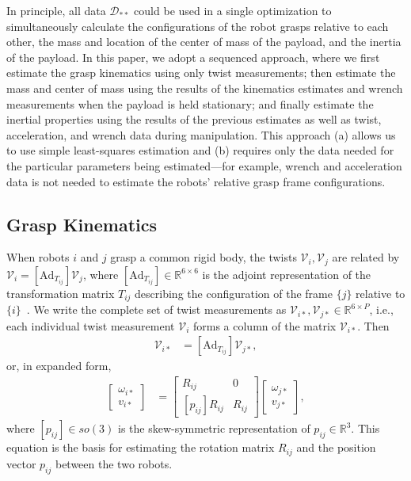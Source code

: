 \documentclass[letterpaper, 10 pt, journal, twoside]{IEEEtran}
\newcommand{\real}{\mathbb{R}}
\newcommand{\twist}{{\mathcal V}}
\begin{document}
In principle, all data $\mathcal{D}_{**}$ could be used in a single optimization to simultaneously calculate the configurations of the robot grasps relative to each other, the mass and location of the center of mass of the payload, and the inertia of the payload. In this paper, we adopt a sequenced approach, where we first estimate the grasp kinematics using only twist measurements; then estimate the mass and center of mass using the results of the kinematics estimates and wrench measurements when the payload is held stationary; and finally estimate the inertial properties using the results of the previous estimates as well as twist, acceleration, and wrench data during manipulation. This approach (a) allows us to use simple least-squares estimation and (b) requires only the data needed for the particular parameters being estimated---for example, wrench and acceleration data is not needed to estimate the robots' relative grasp frame configurations. 

\subsection{Grasp Kinematics}
\label{ssec:kinematics}
When robots $i$ and $j$ grasp a common rigid body, the twists $\twist_i, \twist_j$ are related by $\twist_i = [\text{Ad}_{T_{ij}}] \twist_j$, where $[\text{Ad}_{T_{ij}}] \in \real^{6 \times 6}$ is the adjoint representation of the transformation matrix $T_{ij}$ describing the configuration of the frame $\{j\}$ relative to $\{i\}$~\cite{lynch2017}. We write the complete set of twist measurements as  $\twist_{i*},\twist_{j*} \in\mathbb{R}^{6 \times P}$, i.e., each individual twist measurement $\twist_i$ forms a column of the matrix $\twist_{i*}$. Then
\begin{align}
   \twist_{i*} &= [ \text{Ad}_{T_{ij}} ] \twist_{j*},
\end{align}
or, in expanded form, 
\begin{align}
    \begin{bmatrix}
        \omega_{i*} \\ v_{i*}
    \end{bmatrix}
    & =
    \begin{bmatrix}
        R_{ij} & 0 \\
        [ p_{ij} ] R_{ij} & R_{ij}
    \end{bmatrix}
    \begin{bmatrix}
        \omega_{j*} \\
        v_{j*}
    \end{bmatrix},
\label{eqn:twist}
\end{align}
where $[p_{ij}] \in so(3)$ is the skew-symmetric representation of $p_{ij} \in \real^3$.
This equation is the basis for estimating the rotation matrix $R_{ij}$ and the position vector $p_{ij}$ between the two robots. 
\end{document}
